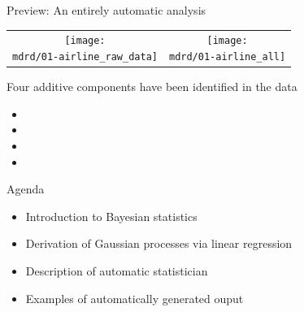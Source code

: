 \begin{frame}{Preview: An entirely automatic analysis}

\newcommand{\wmgd}{0.5\columnwidth}
\newcommand{\hmgd}{3.0cm}
\newcommand{\mdrd}{figures/01-airline}
\newcommand{\mbm}{\hspace{-0.3cm}}
\begin{tabular}{cc}
\mbm \texttt{[image: \\mdrd/01-airline\_raw\_data]} & \texttt{[image: \\mdrd/01-airline\_all]}
\end{tabular}
\vspace{0.5\baselineskip}

{\footnotesize
Four additive components have been identified in the data
\begin{itemize}

  \item  

  \item  

  \item  

  \item  

\end{itemize}
}
\end{frame}

\begin{frame}{Agenda}
  \begin{itemize}
    \item Introduction to Bayesian statistics
    \vspace{\baselineskip}
    \item Derivation of Gaussian processes via linear regression
    \vspace{\baselineskip}
    \item Description of automatic statistician
    \vspace{\baselineskip}
    \item Examples of automatically generated ouput
  \end{itemize}
\end{frame}

